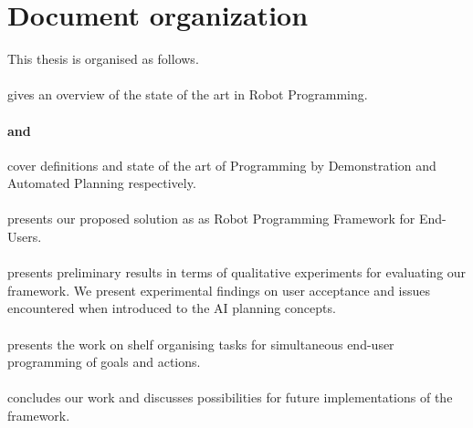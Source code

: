 \section{Document organization}
This thesis is organised as follows. 

\paragraph{} gives an overview of the state of the art in Robot Programming.

\paragraph{ and } cover definitions and state of the art of Programming by Demonstration and Automated Planning respectively.

\paragraph{} presents our proposed solution as as Robot Programming Framework for End-Users.


\paragraph{} presents preliminary results in terms of qualitative experiments for evaluating our framework. We present experimental findings on user acceptance and issues encountered when introduced to the AI planning concepts.

\paragraph{} presents the work on shelf organising tasks for simultaneous end-user programming of goals and actions.

\paragraph{} concludes our work and discusses possibilities for future implementations of the framework.

%